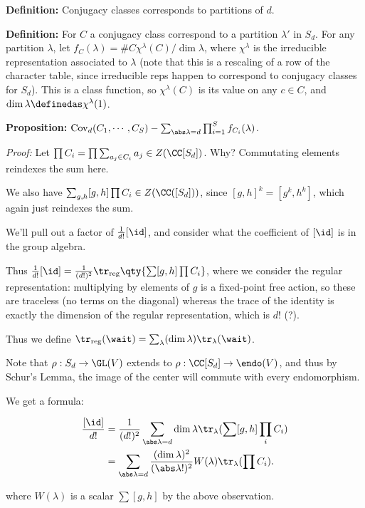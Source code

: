 \textbf{Definition:} Conjugacy classes corresponds to partitions of
\(d\).

\textbf{Definition:} For \(C\) a conjugacy class correspond to a
partition \(\lambda'\) in \(S_d\). For any partition \(\lambda\), let
\(f_C(\lambda) = \# C \chi^\lambda(C) / \dim \lambda\), where
\(\chi^\lambda\) is the irreducible representation associated to
\(\lambda\) (note that this is a rescaling of a row of the character
table, since irreducible reps happen to correspond to conjugacy classes
for \(S_d\)). This is a class function, so \(\chi^\lambda(C)\) is its
value on any \(c\in C\), and
\(\dim \lambda \definedas \chi^\lambda(1)\).

\textbf{Proposition:}
\(\mathrm{Cov}_d(C_1, \cdots, C_S) - \sum_{\abs \lambda = d} \prod_{i=1}^S f_{C_i}(\lambda)\).

\emph{Proof:} Let
\(\prod C_i = \prod \sum_{a_j\in C_i} a_j \in Z(\CC[S_d])\). Why?
Commutating elements reindexes the sum here.

We also have \(\sum_{g, h} [g, h] \prod C_i \in Z(\CC([S_d]))\), since
\([g ,h]^k = [g^k, h^k]\), which again just reindexes the sum.

We'll pull out a factor of \(\frac 1 {d!} [\id]\), and consider what the
coefficient of \([\id]\) is in the group algebra.

Thus
\(\frac{1}{d!} [\id] = \frac{1}{(d!)^2} \tr_{\text{reg}}\qty{ \sum [g, h] \prod C_i }\),
where we consider the regular representation: multiplying by elements of
\(g\) is a fixed-point free action, so these are traceless (no terms on
the diagonal) whereas the trace of the identity is exactly the dimension
of the regular representation, which is \(d!\) (?).

Thus we define
\(\tr_{\text{reg}}(\wait) = \sum_{\lambda} (\dim \lambda) \tr_\lambda(\wait)\).

Note that \(\rho: S_d \to \GL(V)\) extends to
\(\rho: \CC[S_d] \to \endo(V)\), and thus by Schur's Lemma, the image of
the center will commute with every endomorphism.

We get a formula:

\begin{align*}
\frac{[\id]}{d!} 
&= \frac{1}{(d!)^2} \sum_{\abs \lambda = d} \dim \lambda \tr_{\lambda}(\sum [g, h] \prod_i C_i) \\
&= \sum_{\abs \lambda = d} \frac{(\dim \lambda)^2}{(\abs \lambda !)^2} W(\lambda) \tr_\lambda(\prod C_i)
.\end{align*}

where \(W(\lambda)\) is a scalar \(\sum [g, h]\) by the above
observation.

